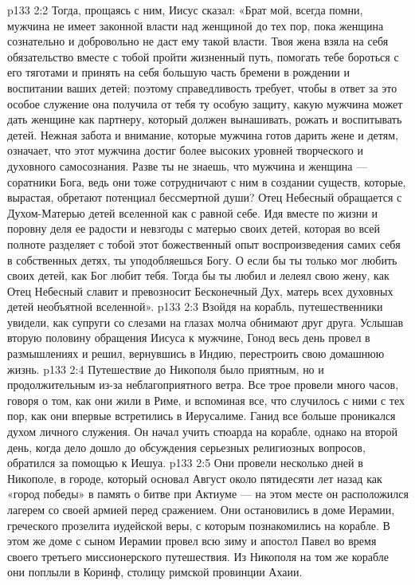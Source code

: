 \vs p133 2:2 Тогда, прощаясь с ним, Иисус сказал: «Брат мой, всегда помни, мужчина не имеет законной власти над женщиной до тех пор, пока женщина сознательно и добровольно не даст ему такой власти. Твоя жена взяла на себя обязательство вместе с тобой пройти жизненный путь, помогать тебе бороться с его тяготами и принять на себя большую часть бремени в рождении и воспитании ваших детей; поэтому справедливость требует, чтобы в ответ за это особое служение она получила от тебя ту особую защиту, какую мужчина может дать женщине как партнеру, который должен вынашивать, рожать и воспитывать детей. Нежная забота и внимание, которые мужчина готов дарить жене и детям, означает, что этот мужчина достиг более высоких уровней творческого и духовного самосознания. Разве ты не знаешь, что мужчина и женщина --- соратники Бога, ведь они тоже сотрудничают с ним в создании существ, которые, вырастая, обретают потенциал бессмертной души? Отец Небесный обращается с Духом\hyp{}Матерью детей вселенной как с равной себе. Идя вместе по жизни и поровну деля ее радости и невзгоды с матерью своих детей, которая во всей полноте разделяет с тобой этот божественный опыт воспроизведения самих себя в собственных детях, ты уподобляешься Богу. О если бы ты только мог любить своих детей, как Бог любит тебя. Тогда бы ты любил и лелеял свою жену, как Отец Небесный славит и превозносит Бесконечный Дух, матерь всех духовных детей необъятной вселенной».
\vs p133 2:3 Взойдя на корабль, путешественники увидели, как супруги со слезами на глазах молча обнимают друг друга. Услышав вторую половину обращения Иисуса к мужчине, Гонод весь день провел в размышлениях и решил, вернувшись в Индию, перестроить свою домашнюю жизнь.
\vs p133 2:4 Путешествие до Никополя было приятным, но и продолжительным из\hyp{}за неблагоприятного ветра. Все трое провели много часов, говоря о том, как они жили в Риме, и вспоминая все, что случилось с ними с тех пор, как они впервые встретились в Иерусалиме. Ганид все больше проникался духом личного служения. Он начал учить стюарда на корабле, однако на второй день, когда дело дошло до обсуждения серьезных религиозных вопросов, обратился за помощью к Иешуа.
\vs p133 2:5 Они провели несколько дней в Никополе, в городе, который основал Август около пятидесяти лет назад как «город победы» в память о битве при Актиуме --- на этом месте он расположился лагерем со своей армией перед сражением. Они остановились в доме Иерамии, греческого прозелита иудейской веры, с которым познакомились на корабле. В этом же доме с сыном Иерамии провел всю зиму и апостол Павел во время своего третьего миссионерского путешествия. Из Никополя на том же корабле они поплыли в Коринф, столицу римской провинции Ахаии.

